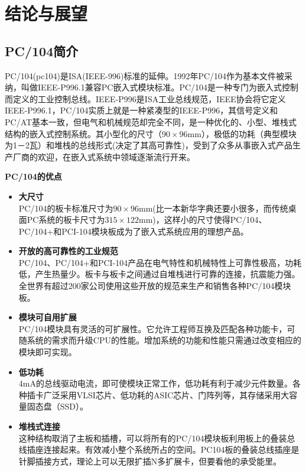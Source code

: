 %
\chapter{结论与展望}
\section{PC/104简介}
PC/104(pc104)是ISA(IEEE-996)标准的延伸。1992年PC/104作为基本文件被采纳，叫做IEEE-P996.1兼容PC嵌入式模块标准。PC/104是一种专门为嵌入式控制而定义的工业控制总线。IEEE-P996是ISA工业总线规范，IEEE协会将它定义IEEE-P996.1，PC/104实质上就是一种紧凑型的IEEE-P996，其信号定义和PC/AT基本一致，但电气和机械规范却完全不同，是一种优化的、小型、堆栈式结构的嵌入式控制系统。其小型化的尺寸（$90\times 96$mm），极低的功耗（典型模块为1－2瓦）和堆栈的总线形式(决定了其高可靠性)，受到了众多从事嵌入式产品生产厂商的欢迎，在嵌入式系统中领域逐渐流行开来。

\textbf{\xiaoer PC/104的优点}
\begin{itemize}
  \item\textbf{\sanhao 大尺寸}\\
    PC/104的板卡标准尺寸为$90\times 96$mm(比一本新华字典还要小很多，而传统桌面PC系统的板卡尺寸为$315\times 122$mm)，这样小的尺寸使得PC/104、PC/104+和PCI-104模块板成为了嵌入式系统应用的理想产品。
  \item\textbf{\sanhao 开放的高可靠性的工业规范}\\ PC/104、PC/104+和PCI-104产品在电气特性和机械特性上可靠性极高，功耗低，产生热量少。板卡与板卡之间通过自堆栈进行可靠的连接，抗震能力强。全世界有超过200家公司使用这些开放的规范来生产和销售各种PC/104模块板。
  \item\textbf{\sanhao 模块可自用扩展}\\ PC/104模块具有灵活的可扩展性。它允许工程师互换及匹配各种功能卡，可随系统的需求而升级CPU的性能。增加系统的功能和性能只需通过改变相应的模块即可实现。
  \item\textbf{\sanhao 低功耗}\\ 4mA的总线驱动电流，即可使模块正常工作，低功耗有利于减少元件数量。各种插卡广泛采用VLSI芯片、低功耗的ASIC芯片、门阵列等，其存储采用大容量固态盘（SSD）。
  \item\textbf{\sanhao 堆栈式连接}\\ 这种结构取消了主板和插槽，可以将所有的PC/104模块板利用板上的叠装总线插座连接起来。有效减小整个系统所占的空间。PC104板的叠装总线插座是针脚插接方式，理论上可以无限扩插N多扩展卡，但要看他的承受能里。
\end{itemize}
